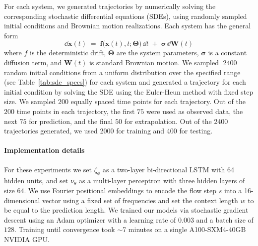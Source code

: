 \documentclass[a4paper,10pt,twocolumn,preprint,3p]{elsarticle}
\begin{document}
For each system, we generated trajectories by numerically solving the corresponding stochastic differential equations (SDEs), using randomly sampled initial conditions and Brownian motion realizations.
Each system has the general form
$$
  \dd \mathbf{x}(t) \;=\; \mathbf{f}\bigl(\mathbf{x}(t),t;\boldsymbol{\Theta}\bigr)\,\dd t 
  \;+\; \boldsymbol{\sigma}\,\dd \mathbf{W}(t)
$$
where \(f\) is the deterministic drift, \(\boldsymbol{\Theta}\) are the system parameters, \(\boldsymbol{\sigma}\) is a constant diffusion term, and \(\mathbf{W}(t)\) is standard Brownian motion.
We sampled \(\;2400\) random initial conditions from a uniform distribution over the specified range (see Table~\ref{tab:sde_specs}) for each system and generated a trajectory for each initial condition by solving the SDE using the Euler-Heun method with fixed step size.  We sampled \(200\) equally spaced time points for each trajectory. Out of the \(200\) time points in each trajectory, the first \(75\) were used as observed data, the next \(75\) for prediction, and the final \(50\) for extrapolation. Out of the 2400 trajectories generated, we used 2000 for training and 400 for testing.



\paragraph{Implementation details} For these experiments we set $\zeta_\phi$ as a two-layer bi-directional LSTM with 64 hidden units, and set $\nu_{\theta}$ as a multi-layer perceptron with three hidden layers of size 64. We use Fourier positional embeddings to encode the flow step $s$ into a 16-dimensional vector using a fixed set of frequencies and set the context length $w$ to be equal to the prediction length. We trained our models via stochastic gradient descent using an Adam optimizer with a learning rate of $0.003$ and a batch size of $128$. Training until convergence took $\sim$7 minutes on a single A100-SXM4-40GB NVIDIA GPU. 
\end{document}
